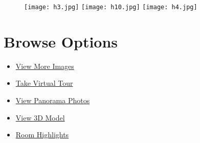 \documentclass[10pt,letterpaper,twocolumn,landscape]{article}
\newcommand{\browseHref}[2]{\href{#1}{\Large #2}}
\newenvironment{cframed}{\begin{mdframed}[linecolor=logoPeach,linewidth=0.4mm]}{\end{mdframed}}
\begin{document}
\begin{cframed}

\hspace{-.1583\textwidth}
\begin{minipage}{1.3\textwidth}
\begin{figure}[H]
\begin{center}
\texttt{[image: h3.jpg]}
\texttt{[image: h10.jpg]}
\texttt{[image: h4.jpg]}
\end{center}
\end{figure}
\end{minipage}


\section*{Browse Options}
\begin{itemize}
\item\browseHref{http://www.njmls.com/listings/index.cfm?action=dsp.info&mlsnum=1810325&openhouse=true&dayssince=15&countysearch=false\#RPDF___ph}{View More Images}
\item\browseHref{http://www.njmls.com/listings/index.cfm?action=dsp.info&mlsnum=1810325&openhouse=true&dayssince=15&countysearch=false\#RPDF___tr}{Take Virtual Tour}
\item\browseHref{http://www.njmls.com/listings/index.cfm?action=dsp.info&mlsnum=1810325&openhouse=true&dayssince=15&countysearch=false}{View Panorama Photos}
\item\browseHref{http://www.njmls.com/listings/index.cfm?action=dsp.info&mlsnum=1810325&openhouse=true&dayssince=15&countysearch=false}{View 3D Model}
\item\browseHref{http://www.njmls.com/listings/index.cfm?action=dsp.info&mlsnum=1810325&openhouse=true&dayssince=15&countysearch=false\#RPDF___rm}{Room Highlights}

\end{itemize}


\end{cframed}
\end{document}
